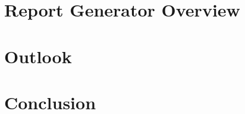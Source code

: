 \documentclass[journal]{IEEEtran}
\begin{document}




\section{Report Generator Overview}



\section{Outlook}




\section{Conclusion}





\printbibliography
\end{document}
